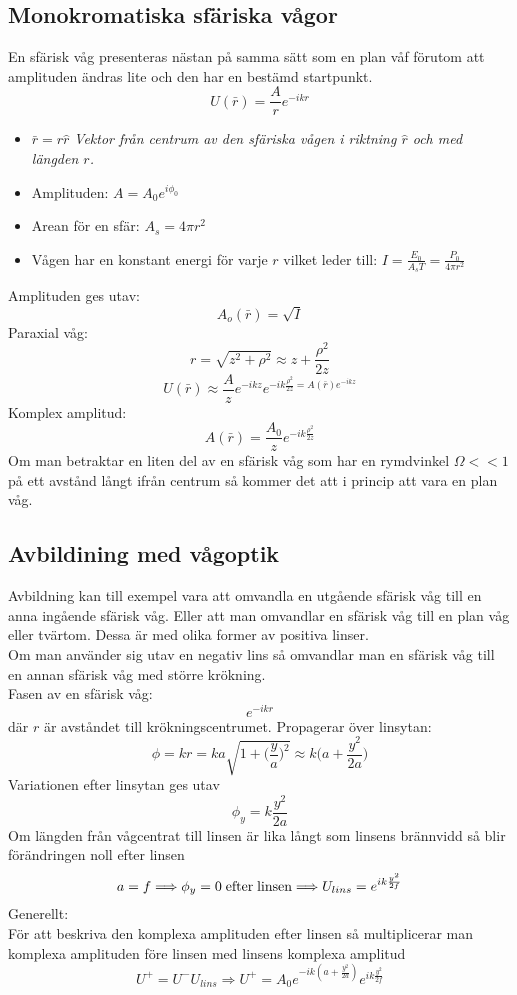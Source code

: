\documentclass{article}
\begin{document}
  \newpage
  \subsection{Monokromatiska sfäriska vågor}
    En sfärisk våg presenteras nästan på samma sätt som en plan våf förutom att amplituden ändras lite och den har en bestämd startpunkt.
    \[
      U(\bar{r})=\frac{A}{r}e^{-ikr}
    \]
    \begin{itemize}
      \item $\bar{r}=r\hat{r}$ \quad\textit{Vektor från centrum av den sfäriska vågen i riktning $\hat{r}$ och med längden $r$.}
      \item Amplituden: $A = A_0e^{i\phi_0}$
      \item Arean för en sfär: $A_s=4\pi r^2$
      \item Vågen har en konstant energi för varje $r$ vilket leder till: $I=\frac{E_0}{A_sT}=\frac{P_0}{4\pi r^2}$
    \end{itemize}
    Amplituden ges utav:
    \[
    A_o(\bar{r})=\sqrt{I}
    \]
    Paraxial våg:
    \[
      r = \sqrt{z^2+\rho^2}\approx z+\frac{\rho^2}{2z}
    \]
    \[
      U(\bar{r})\approx \frac{A}{z}e^{-ikz}e^{-ik\frac{\rho^2}{2z}=A(\bar{r})e^{-ikz}}
    \]
    Komplex amplitud:
    \[
      A(\bar{r})=\frac{A_0}{z}e^{-ik\frac{\rho^2}{2z}}
    \]
    Om man betraktar en liten del av en sfärisk våg som har en rymdvinkel $\Omega<<1$ på ett avstånd långt ifrån centrum så kommer det att i princip att vara en plan våg.
  \newpage
  \subsection{Avbildining med vågoptik}
    Avbildning kan till exempel vara att omvandla en utgående sfärisk våg till en anna ingående sfärisk våg. Eller att man omvandlar en sfärisk våg till en plan våg eller tvärtom. Dessa är med olika former av positiva linser.\\

    Om man använder sig utav en negativ lins så omvandlar man en sfärisk våg till en annan sfärisk våg med större krökning.\\

    Fasen av en sfärisk våg:
    \[
      e^{-ikr}
    \]
    där $r$ är avståndet till krökningscentrumet. Propagerar över linsytan:
    \[
     \phi=kr=ka\sqrt{1+\big(\frac{y}{a}\big)^2}\approx k\big(a+\frac{y^2}{2a}\big)
    \]
    Variationen efter linsytan ges utav
    \[
      \phi_y=k\frac{y^2}{2a}
    \]
    Om längden från vågcentrat till linsen är lika långt som linsens brännvidd så blir förändringen noll efter linsen
    \[
      a=f\Longrightarrow\phi_y=0\;\text{efter\;linsen}\Longrightarrow U_{lins}=e^{ik\frac{y^2}{2f}}
    \]
    Generellt:\\
    För att beskriva den komplexa amplituden efter linsen så multiplicerar man komplexa amplituden före linsen med linsens komplexa amplitud
    \[
      U^+=U^-U_{lins}\Longrightarrow U^+=A_0e^{-ik(a+\frac{y^2}{2a})}e^{ik\frac{y^2}{2f}}
    \]
\end{document}
